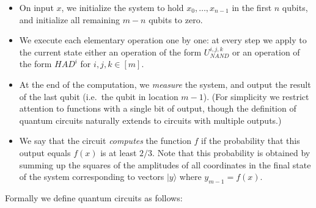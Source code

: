 \begin{itemize}
\item
  On input \(x\), we initialize the system to hold
  \(x_0,\ldots,x_{n-1}\) in the first \(n\) qubits, and initialize all
  remaining \(m-n\) qubits to zero.
\item
  We execute each elementary operation one by one: at every step we
  apply to the current state either an operation of the form
  \(U_{NAND}^{i,j,k}\) or an operation of the form
  \(\ensuremath{\mathit{HAD}}^i\) for \(i,j,k\in [m]\).
\item
  At the end of the computation, we \emph{measure} the system, and
  output the result of the last qubit (i.e.~the qubit in location
  \(m-1\)). (For simplicity we restrict attention to functions with a
  single bit of output, though the definition of quantum circuits
  naturally extends to circuits with multiple outputs.)
\item
  We say that the circuit \emph{computes} the function \(f\) if the
  probability that this output equals \(f(x)\) is at least \(2/3\). Note
  that this probability is obtained by summing up the squares of the
  amplitudes of all coordinates in the final state of the system
  corresponding to vectors \(|y \rangle\) where \(y_{m-1}=f(x)\).
\end{itemize}

Formally we define quantum circuits as follows:

\hypertarget{quantumcircuitdef}{}

